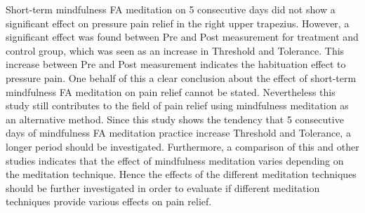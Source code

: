 Short-term mindfulness FA meditation on 5 consecutive days did not show a significant effect on pressure pain relief in the right upper trapezius. However, a significant effect was found between Pre and Post measurement for treatment and control group, which was seen as an increase in Threshold and Tolerance. This increase between Pre and Post measurement  indicates the habituation effect to pressure pain.
One behalf of this a clear conclusion about the effect of short-term mindfulness FA meditation on pain relief cannot be stated. Nevertheless this study still contributes to the field of pain relief using mindfulness meditation as an alternative method. Since this study shows the tendency that 5 consecutive days of mindfulness FA meditation practice increase Threshold and Tolerance, a longer period should be investigated. 
Furthermore, a comparison of this and other studies indicates that the effect of mindfulness meditation varies depending on the meditation technique. Hence the effects of the different meditation techniques should be further investigated in order to evaluate if different meditation techniques provide various effects on pain relief.

